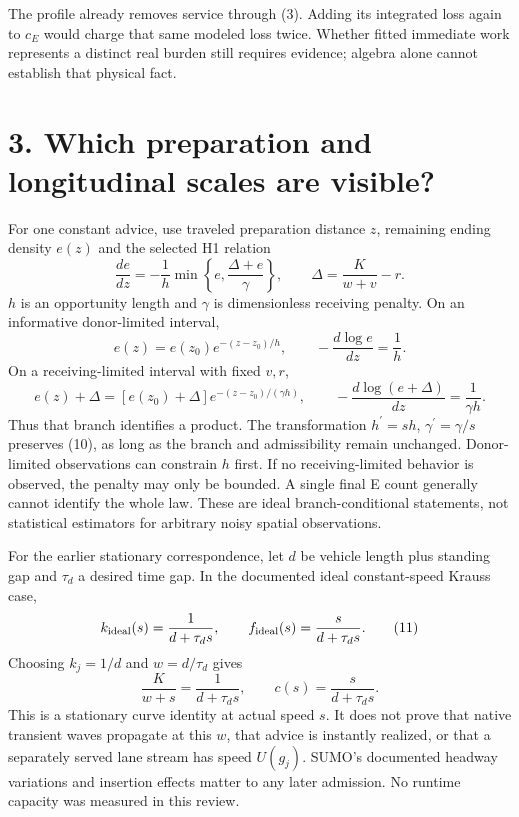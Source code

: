 \documentclass[11pt,a4paper]{article}
\begin{document}
The profile already removes service through (3). Adding its integrated
loss again to $c_E$ would charge that same modeled loss twice.
Whether fitted immediate work represents a distinct real burden still
requires evidence; algebra alone cannot establish that physical fact.

\newpage
\section*{3. Which preparation and longitudinal scales are visible?}
For one constant advice, use traveled preparation distance $z$, remaining
ending density $e(z)$ and the selected H1 relation
\begin{equation}
 \frac{de}{dz}=-\frac1h\min\left\{e,
                  \frac{\Delta+e}{\gamma}\right\},\qquad
 \Delta=\frac{K}{w+v}-r. \tag{8}
\end{equation}
$h$ is an opportunity length and $\gamma$ is dimensionless receiving
penalty. On an informative donor-limited interval,
\begin{equation}
 e(z)=e(z_0)e^{-(z-z_0)/h},\qquad
 -\frac{d\log e}{dz}=\frac1h. \tag{9}
\end{equation}
On a receiving-limited interval with fixed $v,r$,
\begin{equation}
 e(z)+\Delta=[e(z_0)+\Delta]e^{-(z-z_0)/(\gamma h)},\qquad
 -\frac{d\log(e+\Delta)}{dz}=\frac1{\gamma h}. \tag{10}
\end{equation}
Thus that branch identifies a product. The transformation
$h^\prime=s h$, $\gamma^\prime=\gamma/s$ preserves (10), as long as the
branch and admissibility remain unchanged. Donor-limited observations can
constrain $h$ first. If no receiving-limited behavior is observed, the
penalty may only be bounded. A single final E count generally cannot
identify the whole law. These are ideal branch-conditional statements,
not statistical estimators for arbitrary noisy spatial observations.

For the earlier stationary correspondence, let $d$ be vehicle length plus
standing gap and $\tau_d$ a desired time gap. In the documented ideal
constant-speed Krauss case,
\begin{equation}
 k_{\rm ideal}(s)=\frac1{d+\tau_d s},\qquad
 f_{\rm ideal}(s)=\frac{s}{d+\tau_d s}. \tag{11}
\end{equation}
Choosing $k_j=1/d$ and $w=d/\tau_d$ gives
\begin{equation}
 \frac{K}{w+s}=\frac1{d+\tau_d s},\qquad
 c(s)=\frac{s}{d+\tau_d s}. \tag{12}
\end{equation}
This is a stationary curve identity at actual speed $s$. It does not prove
that native transient waves propagate at this $w$, that advice is instantly
realized, or that a separately served lane stream has speed $U(g_j)$.
SUMO's documented headway variations and insertion effects matter to
any later admission. No runtime capacity was measured in this review.
\end{document}

